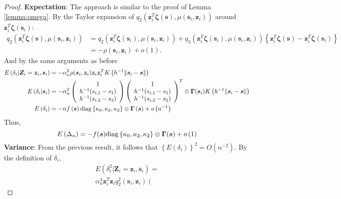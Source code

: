 \documentclass[authoryear,review, 12pt]{elsarticle}
\begin{document}
\begin{proof}
\textbf{Expectation}: The approach is similar to the proof of Lemma
\ref{lemma:omega}. By the Taylor expansion of $q_{2}\left(\bm{z}_{i}^{T}\bm{\zeta}(\bm{s}),\mu\left(\bm{s}_{i},\bm{z}_{i}\right)\right)$
around $\bm{z}_{i}^{T}\bm{\zeta}(\bm{s}_{i})$:
\begin{align*}
q_{2}\left(\bm{z}_{i}^{T}\bm{\zeta}(\bm{s}),\mu(\bm{s}_{i},\bm{z}_{i})\right) &= q_{2}\left(\bm{z}_{i}^{T}\bm{\zeta}(\bm{s}_{i}),\mu(\bm{s}_{i},\bm{z}_{i})\right)+q_{3}\left(\bm{z}_{i}^{T}\bm{\zeta}(\bm{s}_{i}),\mu(\bm{s}_{i},\bm{z}_{i})\right)\left\{ \bm{z}_{i}^{T}\bm{\zeta}(\bm{s})-\bm{z}_{i}^{T}\bm{\zeta}(\bm{s}_{i})\right\} \\
&= -\rho(\bm{s}_{i},\bm{z}_{i})+o\left(1\right).
\end{align*}
And by the same arguments as before
\begin{align*}
E\left(\delta_{i}|\bm{Z}_{i}=\bm{z}_{i},\bm{s}_{i}\right) &= -\alpha_{n}^{2}\rho(\bm{s}_{i},\bm{z}_{i})\bm{z}_{i}\bm{z}_{i}^{T}K\left(h^{-1}\|\bm{s}_{i}-\bm{s}\|\right)\\
E\left(\delta_{i}|\bm{s}_{i}\right) &= -\alpha_{n}^{2}\left(\begin{array}{c}
1\\
h^{-1}(s_{i,1}-s_{1})\\
h^{-1}(s_{i,2}-s_{2})
\end{array}\right)\left(\begin{array}{c}
1\\
h^{-1}(s_{i,1}-s_{1})\\
h^{-1}(s_{i,2}-s_{2})
\end{array}\right)^{T}\otimes\bm{\Gamma}(\bm{s}_{i})K\left(h^{-1}\|\bm{s}_{i}-\bm{s}\|\right)\\
E\left(\delta_{i}\right) &= -nf\left(\bm{s}\right){\rm diag}\left\{ \kappa_{0},\kappa_{2},\kappa_{2}\right\} \otimes\bm{\Gamma}\left(\bm{s}\right)+o\left(n^{-1}\right)
\end{align*}
Thus, 
\[
E\left(\Delta_{n}\right)=-f(\bm{s}){\rm diag}\left\{ \kappa_{0},\kappa_{2},\kappa_{2}\right\} \otimes\bm{\Gamma}(\bm{s})+o\left(1\right)
\]
\textbf{Variance}: From the previous result, it follows that $\left\{ E\left(\delta_{i}\right)\right\} ^{2}=O\left(n^{-2}\right)$.
By the definition of $\delta_{i}$,
\begin{multline*}
E\left(\delta_{i}^{2}|\bm{Z}_{i}=\bm{z}_{i},\bm{s}_{i}\right)=\\
\alpha_{n}^{4}\bm{z}_{i}^{T}\bm{z}_{i}q_{2}^{2}(\bm{s}_{i},\bm{z}_{i})\left(\begin{array}{c}

\end{array}
\end{multline*}
\end{proof}
\end{document}

